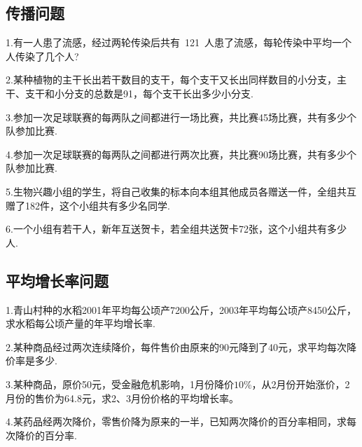 \subsection{传播问题}
1.有一人患了流感，经过两轮传染后共有~121~人患了流感，每轮传染中平均一个人传染了几个人?\par
\vspace{2cm}

2.某种植物的主干长出若干数目的支干，每个支干又长出同样数目的小分支，主干、支干和小分支的总数是91，每个支干长出多少小分支.\par
\vspace{2cm}

3.参加一次足球联赛的每两队之间都进行一场比赛，共比赛45场比赛，共有多少个队参加比赛.\par
\vspace{2cm}

4.参加一次足球联赛的每两队之间都进行两次比赛，共比赛90场比赛，共有多少个队参加比赛.\par
\vspace{2cm}

5.生物兴趣小组的学生，将自己收集的标本向本组其他成员各赠送一件，全组共互赠了182件，这个小组共有多少名同学.\par
\vspace{2cm}

6.一个小组有若干人，新年互送贺卡，若全组共送贺卡72张，这个小组共有多少人.\par
\vspace{2cm}

\subsection{平均增长率问题}
1.青山村种的水稻2001年平均每公顷产7200公斤，2003年平均每公顷产8450公斤，求水稻每公顷产量的年平均增长率.\par
\vspace{2cm}

2.某种商品经过两次连续降价，每件售价由原来的90元降到了40元，求平均每次降价率是多少.\par
\vspace{2cm}

3.某种商品，原价50元，受金融危机影响，1月份降价$10\%$，从2月份开始涨价，2月份的售价为64.8元，求2、3月份价格的平均增长率。\par
\vspace{2cm}

4.某药品经两次降价，零售价降为原来的一半，已知两次降价的百分率相同，求每次降价的百分率.\par
\vspace{2cm}

